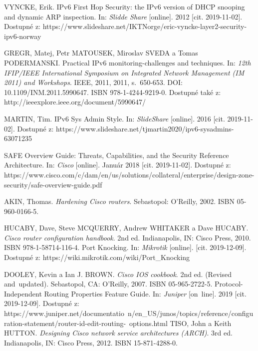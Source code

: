 \begin{literatura}{99}

VYNCKE, Erik. IPv6 First Hop Security: the IPv6 version of DHCP snooping and dynamic ARP inspection. In: \textit{Slidde Share} [online]. 2012 [cit. 2019-11-02]. Dostupné z: https://www.slideshare.net/IKTNorge/eric-vyncke-layer2-security-ipv6-norway


GREGR, Matej, Petr MATOUSEK, Miroslav SVEDA a Tomas PODERMANSKI. Practical IPv6 monitoring-challenges and techniques. In: \textit{12th IFIP/IEEE International Symposium on Integrated Network Management (IM 2011) and Workshops}. IEEE, 2011, 2011, s.~650-653. DOI: 10.1109/INM.2011.5990647. ISBN 978-1-4244-9219-0. Dostupné také z: http://ieeexplore.ieee.org/document/5990647/




MARTIN, Tim. IPv6 Sys Admin Style. In: \textit{SlideShare} [online]. 2016 [cit. 2019-11-02]. Dostupné z: https://www.slideshare.net/tjmartin2020/ipv6-sysadmins-63071235

SAFE Overview Guide: Threats, Capabilities, and the Security Reference Architecture. In: \textit{Cisco} [online]. Január 2018 [cit. 2019-11-02]. Dostupné z: https://www.cisco.com/c/dam/en/us/solutions/collateral/enterprise/design-zone-security/safe-overview-guide.pdf

AKIN, Thomas. \textit{Hardening Cisco routers}. Sebastopol: O'Reilly, 2002. ISBN 05-960-0166-5.

HUCABY, Dave, Steve MCQUERRY, Andrew WHITAKER a Dave HUCABY. \textit{Cisco router configuration handbook}. 2nd ed. Indianapolis, IN: Cisco Press, 2010. ISBN 978-1-58714-116-4.
Port Knocking. In: \textit{Mikrotik} [online]. [cit. 2019-12-09]. Dostupné z: https://wiki.mikrotik.com/wiki/Port\_Knocking



DOOLEY, Kevin a Ian J. BROWN. \textit{Cisco IOS cookbook}. 2nd ed. (Revised and\
updated). Sebastopol, CA: O'Reilly, 2007. ISBN 05-965-2722-5.
Protocol-Independent Routing Properties Feature Guide. In: \textit{Juniper} [on\
line]. 2019 [cit. 2019-12-09]. Dostupné z: https://www.juniper.net/documentatio\
n/en\_US/junos/topics/reference/configuration-statement/router-id-edit-routing-\
options.html
\bibitem{Tiso2012}
TISO, John a Keith HUTTON. \textit{Designing Cisco network service architectures (ARCH)}. 3rd ed. Indianapolis, IN: Cisco Press, 2012. ISBN 15-871-4288-0.


\end{literatura}
